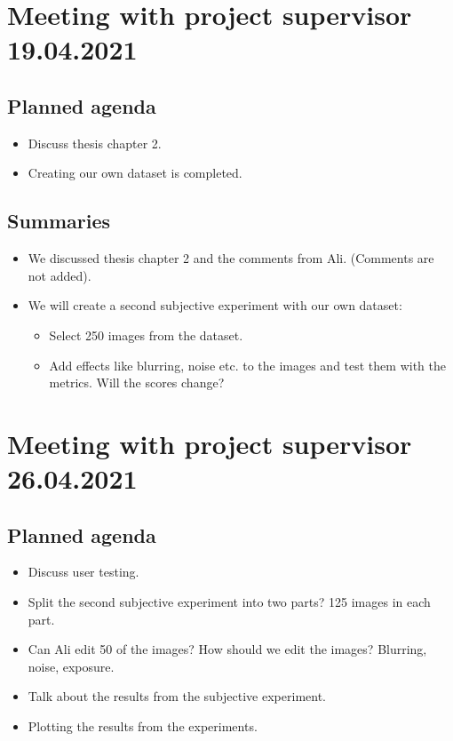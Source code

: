 \newpage

\section*{Meeting with project supervisor 19.04.2021}
\subsection*{Planned agenda}
\begin{itemize}
    \item Discuss thesis chapter 2.
    \item Creating our own dataset is completed.
\end{itemize}

\subsection*{Summaries}
\begin{itemize}
    \item We discussed thesis chapter 2 and the comments from Ali. (Comments are not added).
    \item We will create a second subjective experiment with our own dataset:
    \begin{itemize}
        \item Select 250 images from the dataset.
        \item Add effects like blurring, noise etc. to the images and test them with the metrics. Will the scores change?
    \end{itemize}
\end{itemize}

\newpage

\section*{Meeting with project supervisor 26.04.2021}
\subsection*{Planned agenda}
\begin{itemize}
    \item Discuss user testing.
    \item Split the second subjective experiment into two parts? 125 images in each part.
    \item Can Ali edit 50 of the images? How should we edit the images? Blurring, noise, exposure.
    \item Talk about the results from the subjective experiment.
    \item Plotting the results from the experiments.
\end{itemize}

